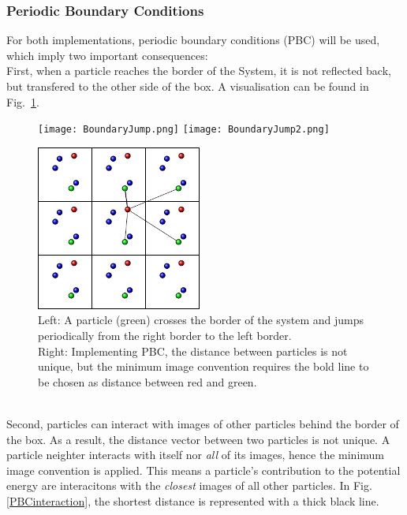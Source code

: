 \subsubsection*{Periodic Boundary Conditions}
For both implementations, periodic boundary conditions (PBC) will be used, which imply two important consequences: \smallskip\\
First, when a particle reaches the border of the System, it is not reflected back, but transfered to the other side of the box.
A visualisation can be found in Fig.~\ref{Fig:PBCJump}.
\begin{figure}[h!]
\centering
\begin{minipage}[t]{0.495\textwidth}
\centering
\texttt{[image: BoundaryJump.png]}
\texttt{[image: BoundaryJump2.png]}
\end{minipage}
\begin{minipage}[t]{0.495\textwidth}
\centering
\includegraphics[width=\textwidth,height=5.425cm]{Figures/tikz/MinimalDistance.pdf}
\end{minipage}
\caption[PBC: Jumps and Periodic Images]{Left: A particle (green) crosses the border of the system and jumps periodically from the right border to the left border.\\
Right: Implementing PBC, the distance between particles is not unique, but the minimum image convention requires the bold line to be chosen as distance between red and green.}
\label{Fig:PBCJump}
\end{figure}\\
Second, particles can interact with images of other particles behind the border of the box. As a result, the distance vector between two particles is not unique.
A particle neighter interacts with itself nor {\em all} of its images, hence the minimum image convention is applied.
This means a particle's contribution to the potential energy are interacitons with the {\em closest} images of all other particles.
In Fig.\ref{PBCinteraction}, the shortest distance is represented with a thick black line.
